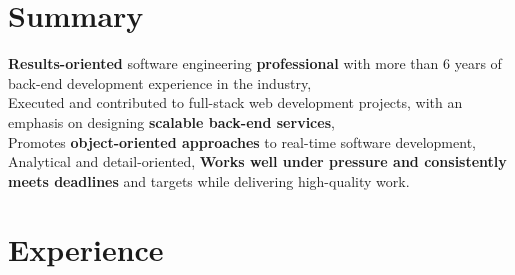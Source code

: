 \documentclass[letterpaper]{deedy-resume} %
\begin{document}
\hfill
%
%
\begin{minipage}[t]{0.66\textwidth} %

\section{Summary}
\textbf{Results-oriented} software engineering \textbf{professional} with more than 6 years of back-end development experience in the industry, \\
Executed and contributed to full-stack web development projects, with an emphasis on designing \textbf{scalable back-end services}, \\ 
Promotes \textbf{object-oriented approaches} to real-time software development, \\
Analytical and detail-oriented, \textbf{Works well under pressure and consistently meets deadlines} and targets while delivering high-quality work.
\sectionspace %

\section{Experience}



\end{minipage}
\end{document}
